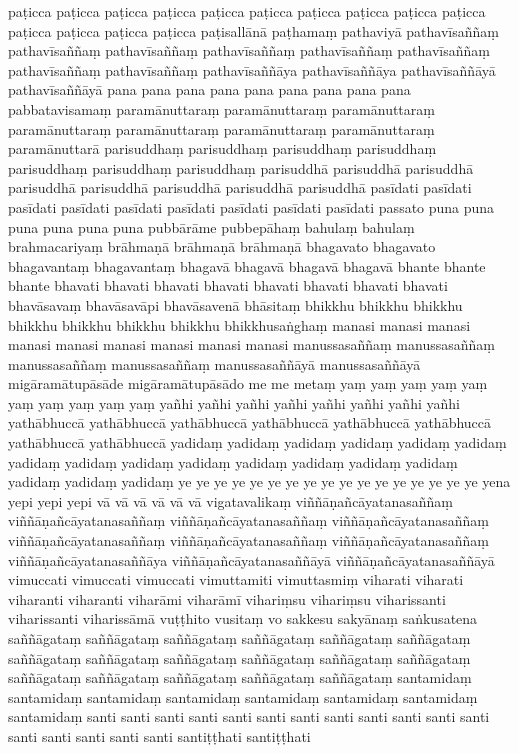 \documentclass[12pt]{article}
\begin{document}
\begin{multicols}{5}
paṭicca
paṭicca
paṭicca
paṭicca
paṭicca
paṭicca
paṭicca
paṭicca
paṭicca
paṭicca
paṭicca
paṭicca
paṭicca
paṭicca
paṭisallānā
paṭhamaṃ
pathaviyā
pathavīsaññaṃ
pathavīsaññaṃ
pathavīsaññaṃ
pathavīsaññaṃ
pathavīsaññaṃ
pathavīsaññaṃ
pathavīsaññaṃ
pathavīsaññaṃ
pathavīsaññāya
pathavīsaññāya
pathavīsaññāyā
pathavīsaññāyā
pana
pana
pana
pana
pana
pana
pana
pana
pana
pabbatavisamaṃ
paramānuttaraṃ
paramānuttaraṃ
paramānuttaraṃ
paramānuttaraṃ
paramānuttaraṃ
paramānuttaraṃ
paramānuttaraṃ
paramānuttarā
parisuddhaṃ
parisuddhaṃ
parisuddhaṃ
parisuddhaṃ
parisuddhaṃ
parisuddhaṃ
parisuddhaṃ
parisuddhā
parisuddhā
parisuddhā
parisuddhā
parisuddhā
parisuddhā
parisuddhā
parisuddhā
pasīdati
pasīdati
pasīdati
pasīdati
pasīdati
pasīdati
pasīdati
pasīdati
pasīdati
passato
puna
puna
puna
puna
puna
puna
pubbārāme
pubbepāhaṃ
bahulaṃ
bahulaṃ
brahmacariyaṃ
brāhmaṇā
brāhmaṇā
brāhmaṇā
bhagavato
bhagavato
bhagavantaṃ
bhagavantaṃ
bhagavā
bhagavā
bhagavā
bhagavā
bhante
bhante
bhante
bhavati
bhavati
bhavati
bhavati
bhavati
bhavati
bhavati
bhavati
bhavāsavaṃ
bhavāsavāpi
bhavāsavenā
bhāsitaṃ
bhikkhu
bhikkhu
bhikkhu
bhikkhu
bhikkhu
bhikkhu
bhikkhu
bhikkhusaṅghaṃ
manasi
manasi
manasi
manasi
manasi
manasi
manasi
manasi
manasi
manussasaññaṃ
manussasaññaṃ
manussasaññaṃ
manussasaññaṃ
manussasaññāyā
manussasaññāyā
migāramātupāsāde
migāramātupāsādo
me
me
metaṃ
yaṃ
yaṃ
yaṃ
yaṃ
yaṃ
yaṃ
yaṃ
yaṃ
yaṃ
yaṃ
yañhi
yañhi
yañhi
yañhi
yañhi
yañhi
yañhi
yañhi
yathābhuccā
yathābhuccā
yathābhuccā
yathābhuccā
yathābhuccā
yathābhuccā
yathābhuccā
yathābhuccā
yadidaṃ
yadidaṃ
yadidaṃ
yadidaṃ
yadidaṃ
yadidaṃ
yadidaṃ
yadidaṃ
yadidaṃ
yadidaṃ
yadidaṃ
yadidaṃ
yadidaṃ
yadidaṃ
yadidaṃ
yadidaṃ
yadidaṃ
ye
ye
ye
ye
ye
ye
ye
ye
ye
ye
ye
ye
ye
ye
ye
ye
ye
yena
yepi
yepi
yepi
vā
vā
vā
vā
vā
vā
vigatavalikaṃ
viññāṇañcāyatanasaññaṃ
viññāṇañcāyatanasaññaṃ
viññāṇañcāyatanasaññaṃ
viññāṇañcāyatanasaññaṃ
viññāṇañcāyatanasaññaṃ
viññāṇañcāyatanasaññaṃ
viññāṇañcāyatanasaññaṃ
viññāṇañcāyatanasaññāya
viññāṇañcāyatanasaññāyā
viññāṇañcāyatanasaññāyā
vimuccati
vimuccati
vimuccati
vimuttamiti
vimuttasmiṃ
viharati
viharati
viharanti
viharanti
viharāmi
viharāmī
vihariṃsu
vihariṃsu
viharissanti
viharissanti
viharissāmā
vuṭṭhito
vusitaṃ
vo
sakkesu
sakyānaṃ
saṅkusatena
saññāgataṃ
saññāgataṃ
saññāgataṃ
saññāgataṃ
saññāgataṃ
saññāgataṃ
saññāgataṃ
saññāgataṃ
saññāgataṃ
saññāgataṃ
saññāgataṃ
saññāgataṃ
saññāgataṃ
saññāgataṃ
saññāgataṃ
saññāgataṃ
saññāgataṃ
santamidaṃ
santamidaṃ
santamidaṃ
santamidaṃ
santamidaṃ
santamidaṃ
santamidaṃ
santamidaṃ
santi
santi
santi
santi
santi
santi
santi
santi
santi
santi
santi
santi
santi
santi
santi
santi
santi
santiṭṭhati
santiṭṭhati

\end{multicols}
\end{document}
